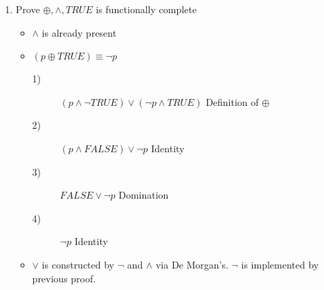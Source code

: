 \documentclass[12pt]{article}
\newcommand{\xor}{\oplus}
\begin{document}
\begin{enumerate}
\begin{itemize}
                \item For all compound propositions, there exists $2^n$ combinations of basic propositions, where n is the number of basic propositions.
                \item For all combinations, the compound proposition is either true or false.
                \item CNF can be written as "as long as none of the variable combinations that make the proposition false are satisfied, then the compound proposition is true."
                \item Basically, $\neg ((a_1 \land a_2 \land ... \land a_n) \lor (b_1 \land b_2 \land ... \land b_n) \lor ...)$ where a, b, ... are combinations of basic propositions that make the proposition false.
                \item Applying De Morgan's, we get $\neg (a_1 \land a_2 \land ... \land a_n) \land \neg (b_1 \land b_2 \land ... \land b_n) \and ...$
                \item Again. $ (\neg a_1 \lor \neg a_2 \lor ... \lor \neg a_n) \land (\neg b_1 \lor \neg b_2 \lor ... \lor \neg b_n) \land ...$
                \item This is CNF. All conjugated clauses are the disjunction of the negation of basic propositions which make the compound proposition false.
            \end{itemize}
        \item Prove $\xor, \land, TRUE$ is functionally complete
            \begin{itemize}
                \item $\land$ is already present
                \item $(p \xor TRUE) \equiv \neg p$
                    \begin{description}
                        \item[1)] $(p \land \neg TRUE) \lor (\neg p \land TRUE)$ Definition of $\xor$
                        \item[2)] $(p \land FALSE) \lor \neg p$ Identity
                        \item[3)] $FALSE \lor \neg p$ Domination
                        \item[4)] $\neg p$ Identity
                    \end{description}
                \item $\lor$ is constructed by $\neg$ and $\land$ via De Morgan's. $\neg$ is implemented by previous proof.
                    \begin{description}

\end{description}
\end{itemize}
\end{enumerate}
\end{document}
